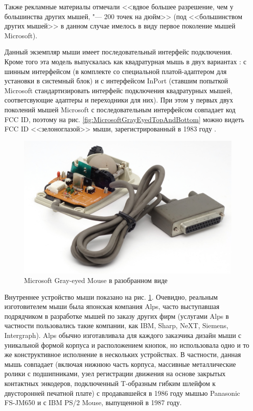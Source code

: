 \documentclass[11pt, a4paper]{article}
\begin{document}
Также рекламные материалы отмечали <<вдвое большее разрешение, чем у большинства других мышей, "--- 200 точек на дюйм>> (под <<большинством других мышей>> в данном случае имелось в виду первое поколение мышей Microsoft).

Данный экземпляр мыши имеет последовательный интерфейс подключения. Кроме того эта модель выпускалась как квадратурная мышь в двух вариантах \cite{guide}: с шинным интерфейсом (в комплекте со специальной платой-адаптером для установки в системный блок) и с интерфейсом InPort (ставшим попыткой Microsoft стандартизировать интерфейс подключения квадратурных мышей,  соответсвующие адаптеры и переходники для них). При этом у первых двух поколений мышей Microsoft с последовательным интерфейсом совпадает код FCC ID, поэтому на рис. \ref{fig:MicrosoftGrayEyedTopAndBottom} можно видеть FCC ID <<зелоноглазой>> мыши, зарегистрированный в 1983 году \cite{zero}.

\begin{figure}[h]
    \centering
    \includegraphics[scale=0.6]{1985_microsoft_gray_eyed_mouse/inside_30.jpg}
    \caption{Microsoft Gray-eyed Mouse в разобранном виде}
    \label{fig:MicrosoftGrayEyedInside}
\end{figure}

Внутреннее устройство мыши показано на рис. \ref{fig:MicrosoftGrayEyedInside}. Очевидно, реальным изготовителем мыши была японская компания Alps, часто выступавшая подрядчиком в разработке мышей по заказу других фирм (услугами Alps в частности пользовались такие компании, как IBM, Sharp, NeXT, Siemens, Intergraph). Alps обычно изготавливала для каждого заказчика дизайн мыши с уникальной формой корпуса и расположением кнопок, но использовала одно и то же конструктивное исполнение в нескольких устройствах. В частности, данная мышь совпадает (включая нижнюю часть корпуса, массивные металлические ролики с подшипниками, узел регистрации движения на основе закрытых контактных энкодеров, подключенный T-образным гибким шлейфом к двусторонней печатной плате) с продававшейся в 1986 году мышью Panasonic FS-JM650 и с IBM PS/2 Mouse, выпущенной в 1987 году.
\end{document}
